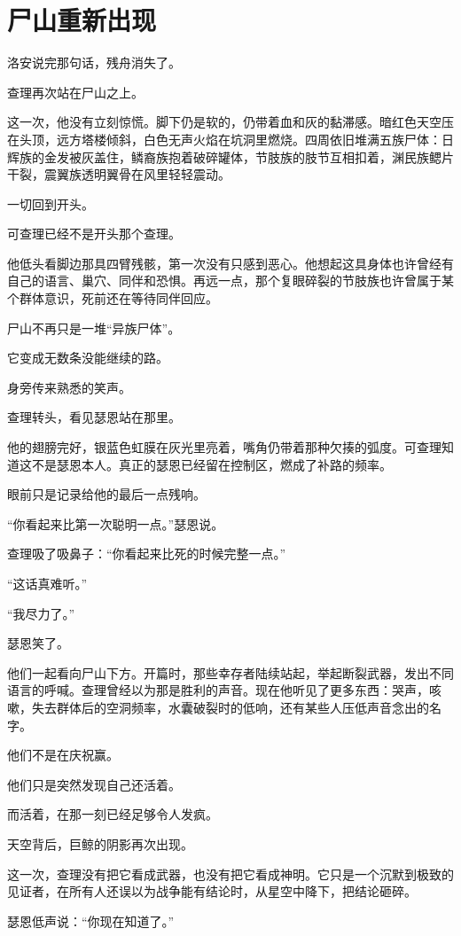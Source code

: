 \chapter{尸山重新出现}

洛安说完那句话，残舟消失了。

查理再次站在尸山之上。

这一次，他没有立刻惊慌。脚下仍是软的，仍带着血和灰的黏滞感。暗红色天空压在头顶，远方塔楼倾斜，白色无声火焰在坑洞里燃烧。四周依旧堆满五族尸体：日辉族的金发被灰盖住，鳞裔族抱着破碎罐体，节肢族的肢节互相扣着，渊民族鳃片干裂，震翼族透明翼骨在风里轻轻震动。

一切回到开头。

可查理已经不是开头那个查理。

他低头看脚边那具四臂残骸，第一次没有只感到恶心。他想起这具身体也许曾经有自己的语言、巢穴、同伴和恐惧。再远一点，那个复眼碎裂的节肢族也许曾属于某个群体意识，死前还在等待同伴回应。

尸山不再只是一堆“异族尸体”。

它变成无数条没能继续的路。

身旁传来熟悉的笑声。

查理转头，看见瑟恩站在那里。

他的翅膀完好，银蓝色虹膜在灰光里亮着，嘴角仍带着那种欠揍的弧度。可查理知道这不是瑟恩本人。真正的瑟恩已经留在控制区，燃成了补路的频率。

眼前只是记录给他的最后一点残响。

“你看起来比第一次聪明一点。”瑟恩说。

查理吸了吸鼻子：“你看起来比死的时候完整一点。”

“这话真难听。”

“我尽力了。”

瑟恩笑了。

他们一起看向尸山下方。开篇时，那些幸存者陆续站起，举起断裂武器，发出不同语言的呼喊。查理曾经以为那是胜利的声音。现在他听见了更多东西：哭声，咳嗽，失去群体后的空洞频率，水囊破裂时的低响，还有某些人压低声音念出的名字。

他们不是在庆祝赢。

他们只是突然发现自己还活着。

而活着，在那一刻已经足够令人发疯。

天空背后，巨鲸的阴影再次出现。

这一次，查理没有把它看成武器，也没有把它看成神明。它只是一个沉默到极致的见证者，在所有人还误以为战争能有结论时，从星空中降下，把结论砸碎。

瑟恩低声说：“你现在知道了。”

